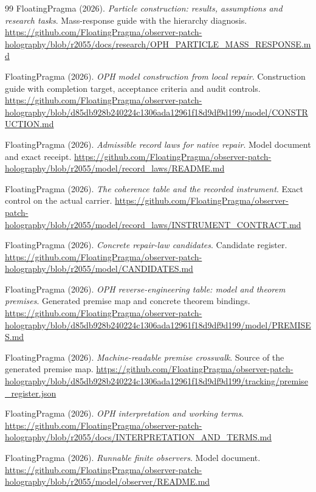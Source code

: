 \documentclass[11pt]{article}
\theoremstyle{definition}
\theoremstyle{remark}
\theoremstyle{plain}
\begin{document}
{\begin{thebibliography}{99}
FloatingPragma (2026). \emph{Particle construction: results, assumptions and
research tasks}. Mass-response guide with the hierarchy diagnosis.
\url{https://github.com/FloatingPragma/observer-patch-holography/blob/r2055/docs/research/OPH_PARTICLE_MASS_RESPONSE.md}

FloatingPragma (2026). \emph{OPH model construction from local repair}.
Construction guide with completion target, acceptance criteria and audit
controls.
\url{https://github.com/FloatingPragma/observer-patch-holography/blob/d85db928b240224c1306ada12961f18d9df9d199/model/CONSTRUCTION.md}

FloatingPragma (2026). \emph{Admissible record laws for native repair}. Model
document and exact receipt.
\url{https://github.com/FloatingPragma/observer-patch-holography/blob/r2055/model/record_laws/README.md}

FloatingPragma (2026). \emph{The coherence table and the recorded
instrument}. Exact control on the actual carrier.
\url{https://github.com/FloatingPragma/observer-patch-holography/blob/r2055/model/record_laws/INSTRUMENT_CONTRACT.md}

FloatingPragma (2026). \emph{Concrete repair-law candidates}. Candidate
register.
\url{https://github.com/FloatingPragma/observer-patch-holography/blob/r2055/model/CANDIDATES.md}

FloatingPragma (2026). \emph{OPH reverse-engineering table: model and theorem
premises}. Generated premise map and concrete theorem bindings.
\url{https://github.com/FloatingPragma/observer-patch-holography/blob/d85db928b240224c1306ada12961f18d9df9d199/model/PREMISES.md}

FloatingPragma (2026). \emph{Machine-readable premise crosswalk}. Source of
the generated premise map.
\url{https://github.com/FloatingPragma/observer-patch-holography/blob/d85db928b240224c1306ada12961f18d9df9d199/tracking/premise_register.json}

FloatingPragma (2026). \emph{OPH interpretation and working terms}.
\url{https://github.com/FloatingPragma/observer-patch-holography/blob/r2055/docs/INTERPRETATION_AND_TERMS.md}

FloatingPragma (2026). \emph{Runnable finite observers}. Model document.
\url{https://github.com/FloatingPragma/observer-patch-holography/blob/r2055/model/observer/README.md}


\end{thebibliography}}
\end{document}
